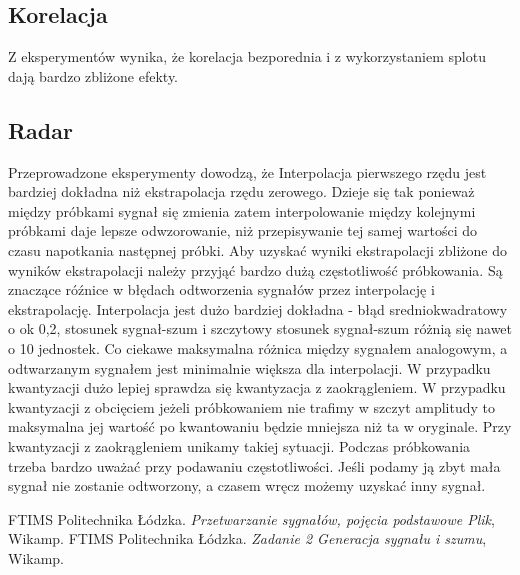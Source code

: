 \documentclass[12pt]{article}
\begin{document}
\subsection{Korelacja}
Z eksperymentów wynika, że korelacja bezporednia i z wykorzystaniem splotu dają bardzo zbliżone efekty.
\subsection{Radar}
Przeprowadzone eksperymenty dowodzą, że  Interpolacja pierwszego rzędu jest bardziej dokładna niż ekstrapolacja rzędu zerowego.  Dzieje się tak ponieważ między próbkami sygnał się zmienia zatem interpolowanie między kolejnymi próbkami daje lepsze odwzorowanie, niż przepisywanie tej samej wartości do czasu napotkania następnej próbki.
Aby uzyskać wyniki ekstrapolacji zbliżone do wyników ekstrapolacji należy przyjąć bardzo dużą częstotliwość próbkowania. Są znaczące róźnice w błędach odtworzenia sygnałów przez interpolację i ekstrapolację. Interpolacja jest dużo bardziej dokładna - błąd sredniokwadratowy o ok 0,2, stosunek sygnał-szum i szczytowy stosunek sygnał-szum różnią się nawet o 10 jednostek. Co ciekawe maksymalna różnica między sygnałem analogowym, a odtwarzanym sygnałem jest minimalnie większa dla interpolacji.
W przypadku kwantyzacji dużo lepiej sprawdza się kwantyzacja z zaokrągleniem. W przypadku kwantyzacji z obcięciem jeżeli próbkowaniem nie trafimy w szczyt amplitudy to maksymalna jej wartość po kwantowaniu będzie mniejsza niż ta w oryginale. Przy kwantyzacji z zaokrągleniem unikamy takiej sytuacji.
Podczas próbkowania trzeba bardzo uważać przy podawaniu częstotliwości. Jeśli podamy ją zbyt mała sygnał nie zostanie odtworzony, a czasem wręcz możemy uzyskać inny sygnał.

\begin{thebibliography}{0}
    FTIMS Politechnika Łódzka.
    \textsl{Przetwarzanie sygnałów, pojęcia podstawowe Plik}, Wikamp.
  FTIMS Politechnika Łódzka.
    \textsl{Zadanie 2 Generacja sygnału i szumu}, Wikamp.
\end{thebibliography}
\end{document}
